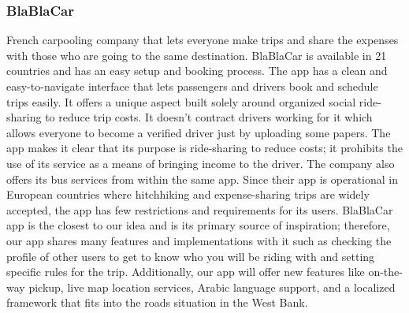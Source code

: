 \documentclass[a4paper, 12pt]{report} %
\begin{document}
            \subsubsection{BlaBlaCar}
                French carpooling company that lets everyone make trips and share the expenses with those who are going to the same destination.
                BlaBlaCar is available in 21 countries and has an easy setup and booking process. The app has a clean and easy-to-navigate interface that lets passengers and drivers book and schedule trips easily. It offers a unique aspect built solely around organized social ride-sharing to reduce trip costs. It doesn't contract drivers working for it which allows everyone to become a verified driver just by uploading some papers. The app makes it clear that its purpose is ride-sharing to reduce costs; it prohibits the use of its service as a means of bringing income to the driver. The company also offers its bus services from within the same app. Since their app is operational in European countries where hitchhiking and expense-sharing trips are widely accepted, the app has few restrictions and requirements for its users. \cite{blablacar_wiki} BlaBlaCar app is the closest to our idea and is its primary source of inspiration; therefore, our app shares many features and implementations with it such as checking the profile of other users to get to know who you will be riding with and setting specific rules for the trip. Additionally, our app will offer new features like on-the-way pickup, live map location services, Arabic language support, and a localized framework that fits into the roads situation in the West Bank.
\end{document}
